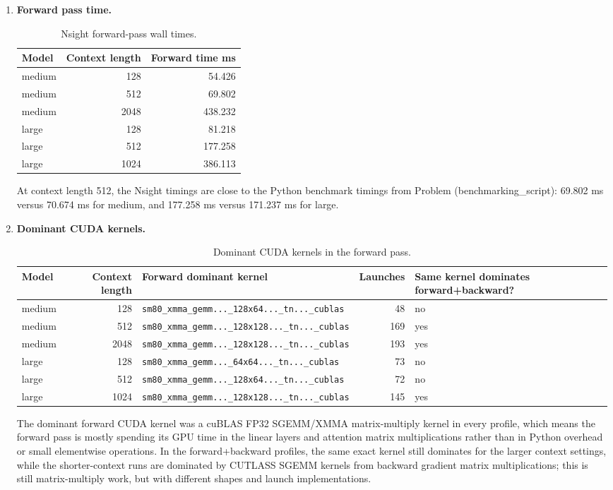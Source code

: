 \documentclass[11pt]{article}
\begin{document}
\begin{enumerate}
  \item \textbf{Forward pass time.}
  \begin{table}[H]
    \centering
    \caption{Nsight forward-pass wall times.}
    \begin{tabular}{lrr}
      \toprule
      Model & Context length & Forward time ms \\
      \midrule
      medium & 128 & 54.426 \\
      medium & 512 & 69.802 \\
      medium & 2048 & 438.232 \\
      large & 128 & 81.218 \\
      large & 512 & 177.258 \\
      large & 1024 & 386.113 \\
      \bottomrule
    \end{tabular}
  \end{table}
  At context length 512, the Nsight timings are close to the Python benchmark timings from Problem (benchmarking\_script): 69.802 ms versus 70.674 ms for medium, and 177.258 ms versus 171.237 ms for large.

  \item \textbf{Dominant CUDA kernels.}
  \begin{table}[H]
    \centering
    \caption{Dominant CUDA kernels in the forward pass.}
    \begin{tabular}{lrlrl}
      \toprule
      Model & Context length & Forward dominant kernel & Launches & Same kernel dominates forward+backward? \\
      \midrule
      medium & 128 & \texttt{sm80\_xmma\_gemm...\_128x64...\_tn...\_cublas} & 48 & no \\
      medium & 512 & \texttt{sm80\_xmma\_gemm...\_128x128...\_tn...\_cublas} & 169 & yes \\
      medium & 2048 & \texttt{sm80\_xmma\_gemm...\_128x128...\_tn...\_cublas} & 193 & yes \\
      large & 128 & \texttt{sm80\_xmma\_gemm...\_64x64...\_tn...\_cublas} & 73 & no \\
      large & 512 & \texttt{sm80\_xmma\_gemm...\_128x64...\_tn...\_cublas} & 72 & no \\
      large & 1024 & \texttt{sm80\_xmma\_gemm...\_128x128...\_tn...\_cublas} & 145 & yes \\
      \bottomrule
    \end{tabular}
  \end{table}
  The dominant forward CUDA kernel was a cuBLAS FP32 SGEMM/XMMA matrix-multiply kernel in every profile, which means the forward pass is mostly spending its GPU time in the linear layers and attention matrix multiplications rather than in Python overhead or small elementwise operations. In the forward+backward profiles, the same exact kernel still dominates for the larger context settings, while the shorter-context runs are dominated by CUTLASS SGEMM kernels from backward gradient matrix multiplications; this is still matrix-multiply work, but with different shapes and launch implementations.


\end{enumerate}
\end{document}
